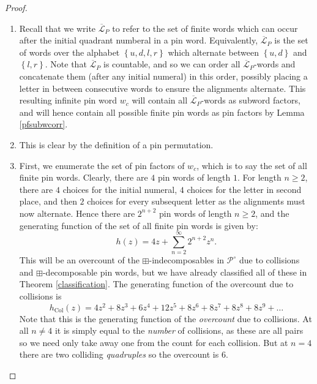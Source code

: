 \documentclass[11pt,a4paper]{article}
\theoremstyle{definition}
\begin{document}
\begin{proof}
\begin{enumerate}
\item Recall that we write $\overline{\mathcal{L}}_{P}$ to refer to the set of finite words which can occur after the initial quadrant numberal in a pin word. Equivalently, $\overline{\mathcal{L}}_{P}$ is the set of words over the alphabet $\left\{u,d,l,r\right\}$ which alternate between $\left\{u,d\right\}$ and $\left\{l,r\right\}$. Note that $\overline{\mathcal{L}}_{P}$ is countable, and so we can order all $\overline{\mathcal{L}}_{P}$-words and concatenate them (after any initial numeral) in this order, possibly placing a letter in between consecutive words to ensure the alignments alternate. This resulting infinite pin word $w_{c}$ will contain all $\overline{\mathcal{L}}_{P}$-words as subword factors, and will hence contain all possible finite pin words as pin factors by Lemma \ref{pfsubwcorr}.
\item This is clear by the definition of a pin permutation.
\item First, we enumerate the set of pin factors of $w_{c}$, which is to say the set of all finite pin words. Clearly, there are $4$ pin words of length $1$. For length $n \geq 2$, there are $4$ choices for the initial numeral, $4$ choices for the letter in second place, and then $2$ choices for every subsequent letter as the alignments must now alternate. Hence there are $2^{n+2}$ pin words of length $n \geq 2$, and the generating function of the set of all finite pin words is given by:
\[
h(z) = 4z + \sum_{n=2}^{\infty}2^{n+2}z^n.
\]
This will be an overcount of the $\boxplus$-indecomposables in $\mathcal{P}^{\circ}$ due to collisions and $\boxplus$-decomposable pin words, but we have already classified all of these in Theorem \ref{classification}. The generating function of the overcount due to collisions is
\[
h_{\text{Col}}(z) = 4z^2 + 8z^3 + 6z^4 + 12z^5 + 8z^6 + 8z^7 + 8z^8 + 8z^9 + \dots
\]
Note that this is the generating function of the \emph{overcount} due to collisions. At all $n \neq 4$ it is simply equal to the \emph{number} of collisions, as these are all pairs so we need only take away one from the count for each collision. But at $n=4$ there are two colliding \emph{quadruples} so the overcount is $6$.


\end{enumerate}
\end{proof}
\end{document}
